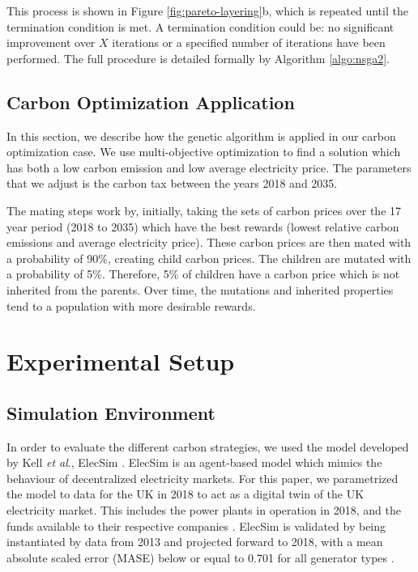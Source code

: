 This process is shown in Figure \ref{fig:pareto-layering}b, which is repeated until the termination condition is met. A termination condition could be:  no significant improvement over $X$ iterations or a specified number of iterations have been performed. The full procedure is detailed formally by Algorithm \ref{algo:nsga2}.


\subsection{Carbon Optimization Application}

In this section, we describe how the genetic algorithm is applied in our carbon optimization case. We use multi-objective optimization to find a solution which has both a low carbon emission and low average electricity price. The parameters that we adjust is the carbon tax between the years 2018 and 2035.

The mating steps work by, initially, taking the sets of carbon prices over the 17 year period (2018 to 2035) which have the best rewards (lowest relative carbon emissions and average electricity price). These carbon prices are then mated with a probability of 90\%, creating child carbon prices. The children are mutated with a probability of 5\%. Therefore, 5\% of children have a carbon price which is not inherited from the parents. Over time, the mutations and inherited properties tend to a population with more desirable rewards.


\section{Experimental Setup}
\label{sec:sim_environment}


\subsection{Simulation Environment}
In order to evaluate the different carbon strategies, we used the model developed by Kell \textit{et al}., ElecSim \cite{Kell,Kell2020}. ElecSim is an agent-based model which mimics the behaviour of decentralized electricity markets. For this paper, we parametrized the model to data for the UK in 2018 to act as a digital twin of the UK electricity market. This includes the power plants in operation in 2018, and the funds available to their respective companies \cite{dukes_511, companies_house}. ElecSim is validated by being instantiated by data from 2013 and projected forward to 2018, with a mean absolute scaled error (MASE) below or equal to 0.701 for all generator types \cite{Kell2020}. 

